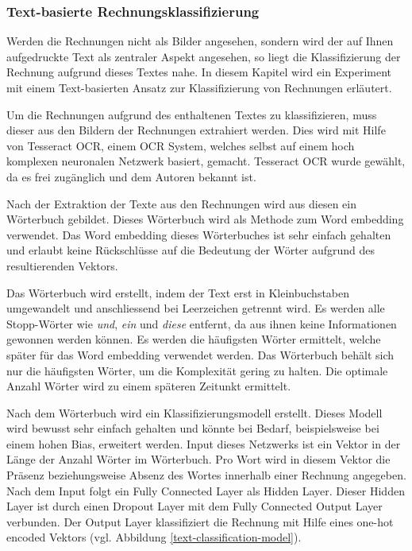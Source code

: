 \subsubsection{Text-basierte Rechnungsklassifizierung}
\label{chap:text-based-classification}

Werden die Rechnungen nicht als Bilder angesehen, sondern wird der auf Ihnen aufgedruckte Text als zentraler Aspekt angesehen, so liegt die Klassifizierung der Rechnung aufgrund dieses Textes nahe. In diesem Kapitel wird ein Experiment mit einem Text-basierten Ansatz zur Klassifizierung von Rechnungen erläutert. 

Um die Rechnungen aufgrund des enthaltenen Textes zu klassifizieren, muss dieser aus den Bildern der Rechnungen extrahiert werden. Dies wird mit Hilfe von Tesseract OCR, einem OCR System, welches selbst auf einem hoch komplexen neuronalen Netzwerk basiert, gemacht. Tesseract OCR wurde gewählt, da es frei zugänglich und dem Autoren bekannt ist. 

Nach der Extraktion der Texte aus den Rechnungen wird aus diesen ein Wörterbuch gebildet. Dieses Wörterbuch wird als Methode zum Word embedding verwendet. Das Word embedding dieses Wörterbuches ist sehr einfach gehalten und erlaubt keine Rückschlüsse auf die Bedeutung der Wörter aufgrund des resultierenden Vektors.

Das Wörterbuch wird erstellt, indem der Text erst in Kleinbuchstaben umgewandelt und anschliessend bei Leerzeichen getrennt wird. Es werden alle Stopp-Wörter wie \textit{und}, \textit{ein} und \textit{diese} entfernt, da aus ihnen keine Informationen gewonnen werden können. Es werden die häufigsten Wörter ermittelt, welche später für das Word embedding verwendet werden. Das Wörterbuch behält sich nur die häufigsten Wörter, um die Komplexität gering zu halten. Die optimale Anzahl Wörter wird zu einem späteren Zeitunkt ermittelt.

Nach dem Wörterbuch wird ein Klassifizierungsmodell erstellt. Dieses Modell wird bewusst sehr einfach gehalten und könnte bei Bedarf, beispielsweise bei einem hohen Bias, erweitert werden. Input dieses Netzwerks ist ein Vektor in der Länge der Anzahl Wörter im Wörterbuch. Pro Wort wird in diesem Vektor die Präsenz beziehungsweise Absenz des Wortes innerhalb einer Rechnung angegeben. Nach dem Input folgt ein Fully Connected Layer als Hidden Layer. Dieser Hidden Layer ist durch einen Dropout Layer mit dem Fully Connected Output Layer verbunden. Der Output Layer klassifiziert die Rechnung mit Hilfe eines one-hot encoded Vektors (vgl. Abbildung \ref{text-classification-model}). 

